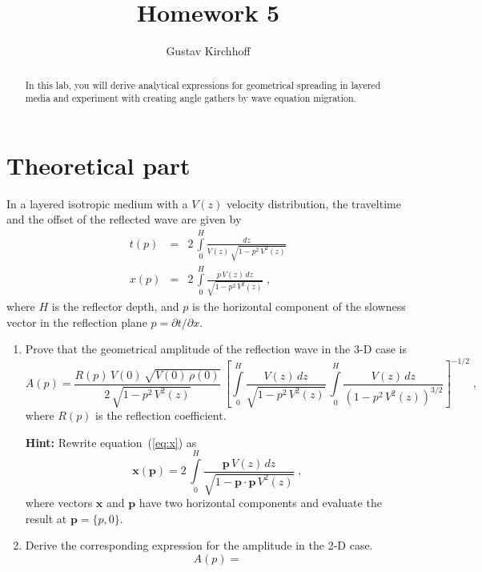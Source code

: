 \author{Gustav Kirchhoff}
\title{Homework 5}

\begin{abstract}
In this lab, you will derive analytical expressions for geometrical
spreading in layered media and experiment with creating angle gathers
by wave equation migration.
\end{abstract}


\section{Theoretical part}

In a layered isotropic medium with a $V(z)$ velocity distribution, the
traveltime and the offset of the reflected wave are given by
\begin{eqnarray}
  \label{eq:t}
  t(p) & = & 2\,\int\limits_{0}^{H} \frac{d z}{V(z)\,\sqrt{1-p^2\,V^2(z)}} \\
  \label{eq:x}
  x(p) & = & 2\,\int\limits_{0}^{H} \frac{p\,V(z)\,d z}{\sqrt{1-p^2\,V^2(z)}}\;,
\end{eqnarray}
where $H$ is the reflector depth, and $p$ is the horizontal component
of the slowness vector in the reflection plane $p = \partial
t/\partial x$. 

\begin{enumerate}
\item Prove that the geometrical amplitude of the reflection
  wave in the 3-D case is
\begin{equation}
  \label{eq:a3}
  A(p) = \frac{R(p)\,V(0)\,\sqrt{V(0)\,\rho(0)}}{2\,\sqrt{1-p^2\,V^2(z)}}\,
    \left[\int\limits_{0}^{H} \frac{V(z)\,d z}{\sqrt{1-p^2\,V^2(z)}}\,
      \int\limits_{0}^{H} \frac{V(z)\,d z}{\left(1-p^2\,V^2(z)\right)^{3/2}}
    \right]^{-1/2}\;,
\end{equation}
where $R(p)$ is the reflection coefficient.

\textbf{Hint:} Rewrite equation~(\ref{eq:x}) as
\begin{equation}
  \label{eq:x3}
  \mathbf{x}(\mathbf{p}) = 2\,\int\limits_{0}^{H} \frac{\mathbf{p}\,V(z)\,d z}{\sqrt{1-\mathbf{p} \cdot \mathbf{p}\,V^2(z)}}\;,
\end{equation}
where vectors $\mathbf{x}$ and $\mathbf{p}$ have two horizontal
components and evaluate the result at $\mathbf{p}=\{p,0\}$.
 
\item Derive the corresponding expression for the amplitude in the 2-D case.
\begin{equation}
  \label{eq:a2}
  A(p) =
\end{equation}

\end{enumerate}

